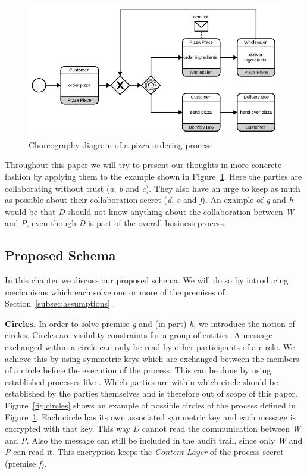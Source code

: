 \documentclass[runningheads]{llncs}
\newcommand{\ber}[1]{\textit{#1}}
\newcommand{\reffig}[1]{Figure~\ref{#1}}
\newcommand{\refsec}[1]{Section~\ref{#1}}
\begin{document}
\begin{figure}[h!]
    \centering
    \includegraphics[scale=0.6]{bpmn.png}
    \caption{Choreography diagram of a pizza ordering process} 
    \label{fig:simple_bpmn}
\end{figure}


Throughout this paper we will try to present our thoughts in more concrete fashion by applying them to the example shown in \reffig{fig:simple_bpmn}. Here the parties are collaborating without trust (\ber{a}, \ber{b} and \ber{c}). They also have an urge to keep as much as possible about their collaboration secret (\ber{d}, \ber{e} and \ber{f}). An example of \ber{g} and \ber{h} would be that \textit{D} 
 should not know anything about the collaboration between \textit{W} and \textit{P}, even though \ber{D} is part of the overall business process. 



\subsection{Proposed Schema} \label{subsec:schema}

In this chapter we discuss our proposed schema. We will do so by introducing mechanisms which each solve one or more of the premises of \refsec{subsec:assumptions} .

\bigbreak
\textbf{Circles.} In order to solve premise \ber{g} and (in part) \ber{h}, we introduce the notion of circles. Circles are visibility constraints for a group of entities. A message exchanged within a circle can only be read by other participants of a circle. We achieve this by using symmetric keys which are exchanged between the members of a circle before the execution of the process. This can be done by using established processes like . Which parties are within which circle should be established by the parties themselves and is therefore out of scope of this paper. \reffig{fig:circles} shows an example of possible circles of the process defined in  \reffig{fig:simple_bpmn}. Each circle has its own associated symmetric key and each message is encrypted with that key. This way \ber{D} cannot read the communication between \ber{W} and \ber{P}. Also the message can still be included in the audit trail, since only \ber{W} and \ber{P} can read it. This encryption keeps the \ber{Content Layer} of the process secret (premise \ber{f}).
\end{document}
